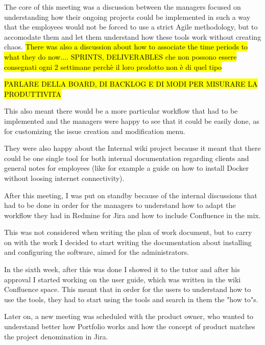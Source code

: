 	The core of this meeting was a discussion between the managers focused on understanding how their ongoing projects could be implemented in such a way that the employees would not be forced to use a strict Agile methodology, but to accomodate them and let them understand how these tools work without creating chaos.
	\hl{There was also a discussion about how to associate the time periods to what they do now.... SPRINTS, DELIVERABLES che non possono essere consegnati ogni 2 settimane perchè il loro prodotto non è di quel tipo}
	
	\hl{PARLARE DELLA BOARD, DI BACKLOG E DI MODI PER MISURARE LA PRODUTTIVITA}
	
	This also meant there would be a more particular workflow that had to be implemented and the managers were happy to see that it could be easily done, as for customizing the issue creation and modification menu.
	
	They were also happy about the Internal wiki project because it meant that there could be one single tool for both internal documentation regarding clients and general notes for employees (like for example a guide on how to install Docker without loosing internet connectivity).
	
	After this meeting, I was put on standby because of the internal discussions that had to be done in order for the managers to understand how to adapt the workflow they had in Redmine for Jira and how to include Confluence in the mix.
	
	This was not considered when writing the plan of work document, but to carry on with the work I decided to start writing the documentation about installing and configuring the software, aimed for the administrators.
	
	In the sixth week, after this was done I showed it to the tutor and after his approval I started working on the user guide, which was written in the wiki Confluence space.
	This meant that in order for the users to understand how to use the tools, they had to start using the tools and search in them the "how to"s.
	
	
	Later on, a new meeting was scheduled with the product owner, who wanted to understand better how Portfolio works and how the concept of product matches the project denomination in Jira.
	

